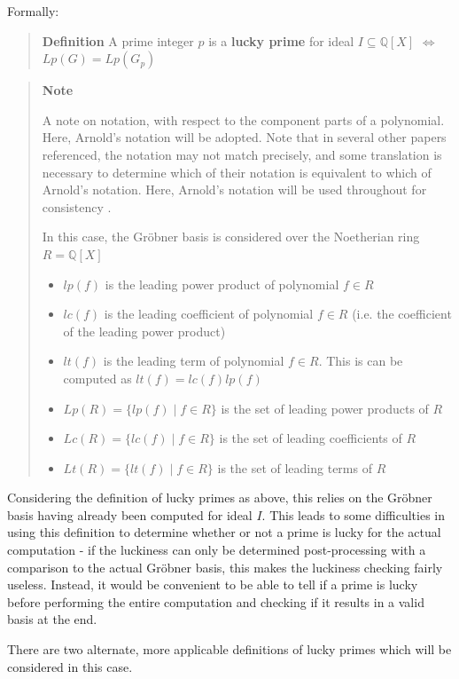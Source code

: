\documentclass[letterpaper,12pt,titlepage,oneside,final]{book}
\newenvironment{defn}{\begin{quote}%
  \textbf{Definition }%
  \quad
}{%
\end{quote}%
}
\newenvironment{note}{\begin{quote}%
  \textbf{Note }%
  \quad
}{%
\end{quote}%
}
\begin{document}
Formally: 
\begin{defn}\label{Lucky Primes}
  A prime integer ${p}$ is a \textbf{lucky prime} for ideal ${I \subseteq \mathbb{Q}[X]}$ ${\iff}$ ${Lp(G) = Lp(G_p)}$ \hfill \cite{Arnold}
\end{defn}

\begin{note}
  A note on notation, with respect to the component parts of a polynomial.  Here, Arnold's notation will be adopted.  Note that in several other papers referenced, the notation may not match precisely, and some translation is necessary to determine which of their notation is equivalent to which of Arnold's notation.  Here, Arnold's notation will be used throughout for consistency \cite{Arnolds}.  

  In this case, the Gr\"obner basis is considered over the Noetherian ring ${R = \mathbb{Q}[X]}$ 
  \begin{itemize}
    \item ${lp(f)}$ is the leading power product of polynomial ${f \in R}$
    \item ${lc(f)}$ is the leading coefficient of polynomial ${f \in R}$ (i.e. the coefficient of the leading power product)
    \item ${lt(f)}$ is the leading term of polynomial ${f \in R}$.  This is can be computed as ${lt(f) = lc(f)lp(f)}$ 
    \item ${Lp(R) = \{lp(f) \mid f \in R\}}$ is the set of leading power products of ${R}$
    \item ${Lc(R) = \{lc(f) \mid f \in R\}}$ is the set of leading coefficients of ${R}$
    \item ${Lt(R) = \{lt(f) \mid f \in R\}}$ is the set of leading terms of ${R}$
  \end{itemize}
\end{note}

Considering the definition of lucky primes as above, this relies on the Gr\"obner basis having already been computed for ideal ${I}$.  This leads to some difficulties in using this definition to determine whether or not a prime is lucky for the actual computation - if the luckiness can only be determined post-processing with a comparison to the actual Gr\"obner basis, this makes the luckiness checking fairly useless.  Instead, it would be convenient to be able to tell if a prime is lucky before performing the entire computation and checking if it results in a valid basis at the end.  

There are two alternate, more applicable definitions of lucky primes which will be considered in this case.
\end{document}
